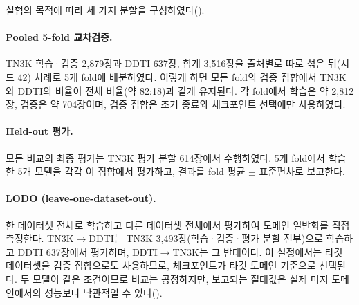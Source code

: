 실험의 목적에 따라 세 가지 분할을 구성하였다().



\paragraph{Pooled 5-fold 교차검증.} TN3K 학습·검증 2,879장과 DDTI 637장, 합계 3,516장을 출처별로 따로
섞은 뒤(시드 42) 차례로 5개 fold에 배분하였다. 이렇게 하면 모든 fold의 검증 집합에서 TN3K와 DDTI의 비율이
전체 비율(약 82:18)과 같게 유지된다. 각 fold에서 학습은 약 2,812장, 검증은 약 704장이며, 검증 집합은
조기 종료와 체크포인트 선택에만 사용하였다.

\paragraph{Held-out 평가.} 모든 비교의 최종 평가는 TN3K 평가 분할 614장에서 수행하였다. 5개 fold에서
학습한 5개 모델을 각각 이 집합에서 평가하고, 결과를 fold 평균 $\pm$ 표준편차로 보고한다.

\paragraph{LODO (leave-one-dataset-out).} 한 데이터셋 전체로 학습하고 다른 데이터셋 전체에서 평가하여
도메인 일반화를 직접 측정한다. TN3K$\rightarrow$DDTI는 TN3K 3,493장(학습·검증·평가 분할 전부)으로 학습하고
DDTI 637장에서 평가하며, DDTI$\rightarrow$TN3K는 그 반대이다. 이 설정에서는 타깃 데이터셋을 검증 집합으로도
사용하므로, 체크포인트가 타깃 도메인 기준으로 선택된다. 두 모델이 같은 조건이므로 비교는 공정하지만,
보고되는 절대값은 실제 미지 도메인에서의 성능보다 낙관적일 수 있다().
